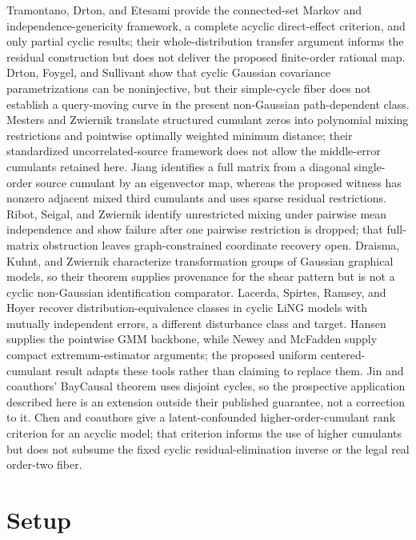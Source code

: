 \documentclass{article}
\begin{document}
Tramontano, Drton, and Etesami provide the connected-set Markov and independence-genericity framework, a complete acyclic direct-effect criterion, and only partial cyclic results; their whole-distribution transfer argument informs the residual construction but does not deliver the proposed finite-order rational map. Drton, Foygel, and Sullivant show that cyclic Gaussian covariance parametrizations can be noninjective, but their simple-cycle fiber does not establish a query-moving curve in the present non-Gaussian path-dependent class. Mesters and Zwiernik translate structured cumulant zeros into polynomial mixing restrictions and pointwise optimally weighted minimum distance; their standardized uncorrelated-source framework does not allow the middle-error cumulants retained here. Jiang identifies a full matrix from a diagonal single-order source cumulant by an eigenvector map, whereas the proposed witness has nonzero adjacent mixed third cumulants and uses sparse residual restrictions. Ribot, Seigal, and Zwiernik identify unrestricted mixing under pairwise mean independence and show failure after one pairwise restriction is dropped; that full-matrix obstruction leaves graph-constrained coordinate recovery open. Draisma, Kuhnt, and Zwiernik characterize transformation groups of Gaussian graphical models, so their theorem supplies provenance for the shear pattern but is not a cyclic non-Gaussian identification comparator. Lacerda, Spirtes, Ramsey, and Hoyer recover distribution-equivalence classes in cyclic LiNG models with mutually independent errors, a different disturbance class and target. Hansen supplies the pointwise GMM backbone, while Newey and McFadden supply compact extremum-estimator arguments; the proposed uniform centered-cumulant result adapts these tools rather than claiming to replace them. Jin and coauthors' BayCausal theorem uses disjoint cycles, so the prospective application described here is an extension outside their published guarantee, not a correction to it. Chen and coauthors give a latent-confounded higher-order-cumulant rank criterion for an acyclic model; that criterion informs the use of higher cumulants but does not subsume the fixed cyclic residual-elimination inverse or the legal real order-two fiber.

\section{Setup}
\end{document}
